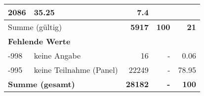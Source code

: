 \begin{longtable}{lXrrr}
       \num{2086} &
       \num[round-mode=places,round-precision=2]{35.25} &
         \num[round-mode=places,round-precision=2]{7.4} \\
     \midrule
     \multicolumn{2}{l}{Summe (gültig)} &
       \textbf{\num{5917}} &
     \textbf{\num{100}} &
       \textbf{\num[round-mode=places,round-precision=2]{21}} \\
     \multicolumn{5}{l}{\textbf{Fehlende Werte}}\\
       -998 &
       keine Angabe &
         \num{16} &
        - &
         \num[round-mode=places,round-precision=2]{0.06} \\
       -995 &
       keine Teilnahme (Panel) &
         \num{22249} &
        - &
         \num[round-mode=places,round-precision=2]{78.95} \\
     \midrule
     \multicolumn{2}{l}{\textbf{Summe (gesamt)}} &
          \textbf{\num{28182}} &
        \textbf{-} &
        \textbf{\num{100}} \\
     \bottomrule
     \end{longtable}
     

